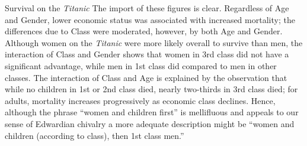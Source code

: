 \begin{Example}[titanic]{Survival on the \emph{Titanic}}
The import of these figures is clear.
Regardless of Age and Gender, lower economic
status was associated with increased mortality; the differences due to Class
were moderated, however, by both Age and Gender.
Although women on the \emph{Titanic}
were more likely overall
to survive than men, the interaction of Class and Gender shows that
women in 3rd class did not have a significant advantage, while men in 1st class
did compared to men in other classes.  The interaction of Class and
Age is explained by the observation
that while no children in 1st or 2nd class died,
nearly two-thirds in 3rd class died;
for adults, mortality increases progressively
as economic class declines.
Hence, although the phrase ``women and
children first'' is mellifluous and appeals to our sense of Edwardian chivalry
a more adequate description might be
``women and children (according to class), then 1st class men.''
\end{Example}
